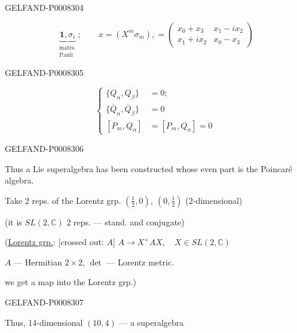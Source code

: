 \begin{GelfandAdjacentEvidence}{GELFAND-P000830}{4}


\[
\underbrace{\mathbf{1},\sigma_i}_{\substack{\text{matrs.}\\\text{Pauli}}};
\qquad x=(X^m\sigma_m),=
\begin{pmatrix}
x_0+x_3&x_1-i x_2\\
x_1+i x_2&x_0-x_3
\end{pmatrix}
\]
\end{GelfandAdjacentEvidence}
\begin{GelfandAdjacentEvidence}{GELFAND-P000830}{5}


\begin{equation*}
\left\{\begin{aligned}
\{Q_\alpha,Q_\beta\}&=0;\\
\{\overline{Q}_\alpha,\overline{Q}_\beta\}&=0\\
[P_m,Q_\alpha]&=[P_m,Q_{\dot\alpha}]=0
\end{aligned}\right.\tag{1}
\end{equation*}
\end{GelfandAdjacentEvidence}
\begin{GelfandAdjacentEvidence}{GELFAND-P000830}{6}


Thus a Lie superalgebra has been constructed whose even part is the Poincaré algebra.

Take 2 reps. of the Lorentz grp. \(\left(\frac12,0\right),\ \left(0,\frac12\right)\) (2-dimensional)

(it is \(SL(2,\mathbb{C})\) 2 reps. — stand. and conjugate)

(\uline{Lorentz grp.}: [crossed out: \sout{\(A\)}]
\(A\to X^+AX,\quad X\in SL(2,\mathbb{C})\)

\(A\) — Hermitian \(2\times2\), \(\det\) — Lorentz metric.

we get a map into the Lorentz grp.)
\end{GelfandAdjacentEvidence}
\begin{GelfandAdjacentEvidence}{GELFAND-P000830}{7}


Thus, 14-dimensional \((10,4)\) — a superalgebra
\end{GelfandAdjacentEvidence}

